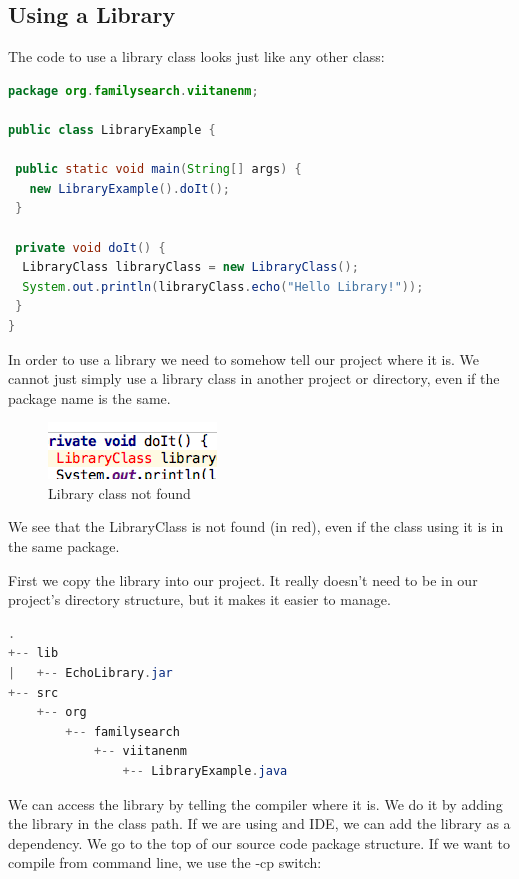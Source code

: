 \subsection{Using a Library}

The code to use a library class looks just like any other class:
\begin{lstlisting}[language=Java]
package org.familysearch.viitanenm;

public class LibraryExample {

 public static void main(String[] args) {
   new LibraryExample().doIt();
 }

 private void doIt() {
  LibraryClass libraryClass = new LibraryClass();
  System.out.println(libraryClass.echo("Hello Library!"));
 }
}
\end{lstlisting}

In order to use a library we need to somehow tell our project where it is. We cannot just simply use a library class in another project or directory, even if the package name is the same.

\begin{figure}[H]
\begin{framed}
\includegraphics{images/library-error}
\end{framed}
\label{fig:libraryerror}
\caption{Library class not found}
\end{figure}

We see that the LibraryClass is not found (in red), even if the class using it is in the same package. 

First we copy the library into our project. It really doesn't need to be in our project's directory structure, but it makes it easier to manage.

\begin{lstlisting}[language=Java]
.
+-- lib
|   +-- EchoLibrary.jar
+-- src
    +-- org
        +-- familysearch
            +-- viitanenm
                +-- LibraryExample.java
\end{lstlisting}

We can access the library by telling the compiler where it is. We do it by adding the library in the class path. If we are using and IDE, we can add the library as a dependency. We go to the top of our source code package structure. If we want to compile from command line, we use the -cp switch:

